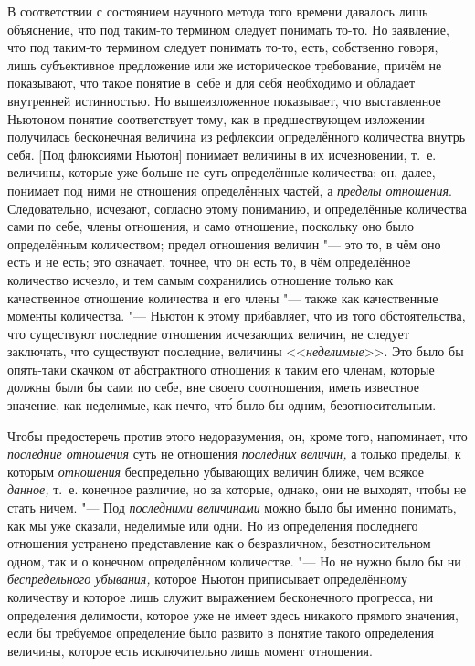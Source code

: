 В соответствии с состоянием научного метода того времени давалось лишь
объяснение, что под таким-то термином следует понимать то-то. Но заявление,
что под таким-то термином следует понимать то-то, есть, собственно говоря,
лишь субъективное предложение или же историческое требование, причём не
показывают, что такое понятие в~себе и для себя необходимо и обладает внутренней
истинностью. Но вышеизложенное показывает, что выставленное Ньютоном понятие
соответствует тому, как в предшествующем изложении получилась бесконечная
величина из рефлексии определённого количества внутрь себя. [Под флюксиями
Ньютон] понимает величины в их исчезновении, т.~е. величины, которые уже больше
не суть определённые количества; он, далее, понимает под ними не отношения
определённых частей, а {\em пределы отношения}. Следовательно, исчезают, согласно
этому пониманию, и определённые количества сами по себе, члены отношения, и
само отношение, поскольку оно было определённым количеством; предел
отношения величин "--- это то, в чём оно есть и не есть; это означает, точнее, что
он есть то, в чём определённое количество исчезло, и тем самым сохранились
отношение только как качественное отношение количества и его члены "--- также
как качественные моменты количества. "--- Ньютон к этому прибавляет, что из
того обстоятельства, что существуют последние отношения исчезающих величин, не
следует заключать, что существуют последние, величины <<{\em неделимые}>>. Это
было бы опять-таки скачком от абстрактного отношения к таким его членам,
которые должны были бы сами по себе, вне своего соотношения, иметь известное
значение, как неделимые, как нечто, чт\'{о} было бы одним, безотносительным.

Чтобы предостеречь против этого недоразумения, он, кроме того, напоминает, что
{\em последние отношения} суть не отношения {\em последних величин,} а только
пределы, к которым {\em отношения} беспредельно убывающих величин
ближе, чем всякое {\em данное,} т.~е. конечное различие, но за которые, однако, они не
выходят, чтобы не стать ничем. "--- Под {\em последними величинами} можно было
бы именно понимать, как мы уже сказали, неделимые или одни. Но из определения
последнего отношения устранено представление как о безразличном,
безотносительном одном, так и о конечном определённом количестве. "--- Но
не нужно было бы ни {\em беспредельного убывания,} которое Ньютон приписывает
определённому количеству и которое лишь служит выражением бесконечного
прогресса, ни определения делимости, которое уже не имеет здесь никакого
прямого значения, если бы требуемое определение было развито
в понятие такого определения величины, которое есть исключительно
лишь момент отношения.


